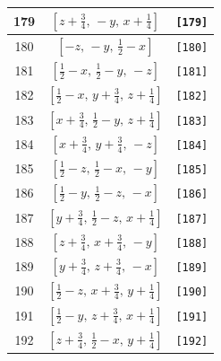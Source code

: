 \documentclass[fleqn,8pt]{jsarticle}
\begin{document}
\begin{longtable}{ccc}
179 & $\left[ z + \frac{3}{4},\, - y,\, x + \frac{1}{4} \right]$ & {\tt [179]} \\ \hline
180 & $\left[ - z,\, - y,\, \frac{1}{2} - x \right]$ & {\tt [180]} \\ \hline
181 & $\left[ \frac{1}{2} - x,\, \frac{1}{2} - y,\, - z \right]$ & {\tt [181]} \\ \hline
182 & $\left[ \frac{1}{2} - x,\, y + \frac{3}{4},\, z + \frac{1}{4} \right]$ & {\tt [182]} \\ \hline
183 & $\left[ x + \frac{3}{4},\, \frac{1}{2} - y,\, z + \frac{1}{4} \right]$ & {\tt [183]} \\ \hline
184 & $\left[ x + \frac{3}{4},\, y + \frac{3}{4},\, - z \right]$ & {\tt [184]} \\ \hline
185 & $\left[ \frac{1}{2} - z,\, \frac{1}{2} - x,\, - y \right]$ & {\tt [185]} \\ \hline
186 & $\left[ \frac{1}{2} - y,\, \frac{1}{2} - z,\, - x \right]$ & {\tt [186]} \\ \hline
187 & $\left[ y + \frac{3}{4},\, \frac{1}{2} - z,\, x + \frac{1}{4} \right]$ & {\tt [187]} \\ \hline
188 & $\left[ z + \frac{3}{4},\, x + \frac{3}{4},\, - y \right]$ & {\tt [188]} \\ \hline
189 & $\left[ y + \frac{3}{4},\, z + \frac{3}{4},\, - x \right]$ & {\tt [189]} \\ \hline
190 & $\left[ \frac{1}{2} - z,\, x + \frac{3}{4},\, y + \frac{1}{4} \right]$ & {\tt [190]} \\ \hline
191 & $\left[ \frac{1}{2} - y,\, z + \frac{3}{4},\, x + \frac{1}{4} \right]$ & {\tt [191]} \\ \hline
192 & $\left[ z + \frac{3}{4},\, \frac{1}{2} - x,\, y + \frac{1}{4} \right]$ & {\tt [192]} \\
\end{longtable}
\end{document}

